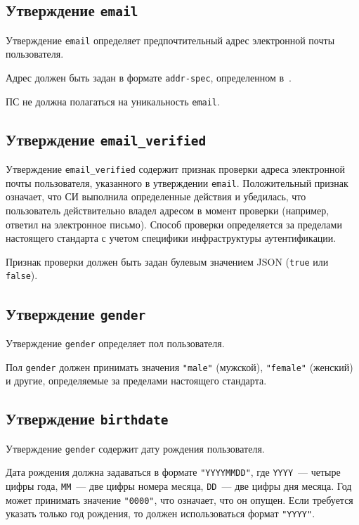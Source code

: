 \subsection{Утверждение \lstinline{email}}\label{CLAIMS.Email}

Утверждение \lstinline{email} определяет предпочтительный адрес электронной 
почты пользователя.

Адрес должен быть задан в формате \lstinline{addr-spec}, определенном 
в~\cite{RFC5322}.

ПС не должна полагаться на уникальность \lstinline{email}.

\subsection{Утверждение \lstinline{email_verified}}\label{CLAIMS.EmailVerified}

Утверждение \lstinline{email_verified} содержит признак проверки адреса
электронной почты пользователя, указанного в утверждении \lstinline{email}.
%
Положительный признак означает, что СИ выполнила определенные действия и
убедилась, что пользователь действительно владел адресом в момент проверки
(например, ответил на электронное письмо).
%
Способ проверки определяется за пределами настоящего стандарта с учетом 
специфики инфраструктуры аутентификации.  

Признак проверки должен быть задан булевым значением JSON
(\lstinline{true} или \lstinline{false}).

\subsection{Утверждение \lstinline{gender}}\label{CLAIMS.Gender}

Утверждение \lstinline{gender} определяет пол пользователя. 

Пол \lstinline{gender} должен принимать значения 
\lstinline{"male"} (мужской), \lstinline{"female"} (женский)
и другие, определяемые за пределами настоящего стандарта.

\subsection{Утверждение \lstinline{birthdate}}\label{CLAIMS.Birthdate}

Утверждение \lstinline{gender} содержит дату рождения пользователя. 

Дата рождения должна задаваться в формате \lstinline{"YYYYMMDD"},
где \lstinline{YYYY}~--- четыре цифры года, \lstinline{MM}~--- две цифры номера 
месяца, \lstinline{DD}~--- две цифры дня месяца.
%
Год может принимать значение \lstinline{"0000"}, что означает, что он опущен. 
%
Если требуется указать только год рождения, то должен использоваться формат 
\lstinline{"YYYY"}. 

